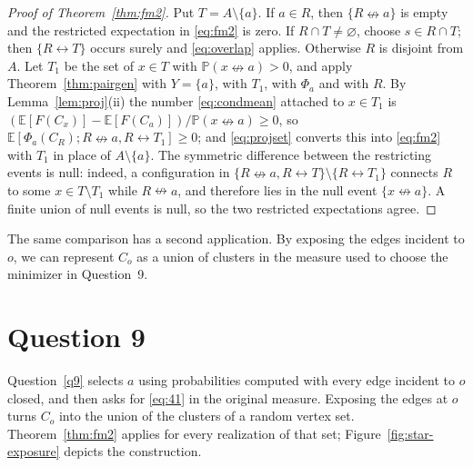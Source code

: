 \documentclass[11pt]{article}
\theoremstyle{definition}
\theoremstyle{remark}
\newcommand{\PP}{\mathbb P}
\newcommand{\EE}{\mathbb E}
\newcommand{\con}{\leftrightarrow}
\newcommand{\ncon}{\nleftrightarrow}
\begin{document}
\begin{proof}[Proof of Theorem~\ref{thm:fm2}]
Put $T=A\setminus\{a\}$. If $a\in R$, then $\{R\ncon
a\}$ is empty and the restricted expectation in \eqref{eq:fm2} is zero. If
$R\cap T\neq\varnothing$, choose $s\in R\cap T$; then $\{R\con T\}$ occurs surely and
\eqref{eq:overlap} applies. Otherwise $R$ is
disjoint from $A$. Let $T_1$ be the set of $x\in T$ with $\PP(x\ncon a)>0$, and apply
Theorem~\ref{thm:pairgen} with $Y=\{a\}$, with $T_1$, with $\Phi_a$ and with $R$. By
Lemma~\ref{lem:proj}(ii) the number \eqref{eq:condmean} attached to $x\in T_1$ is
$(\EE[F(C_x)]-\EE[F(C_a)])/\PP(x\ncon a)\ge0$, so $\EE[\Phi_a(C_R);R\ncon a,R\con
T_1]\ge0$; and \eqref{eq:projset} converts this into \eqref{eq:fm2} with $T_1$ in place of
$A\setminus\{a\}$. The symmetric difference between the restricting events is null:
indeed, a configuration in $\{R\ncon a,R\con T\}\setminus\{R\con T_1\}$ connects $R$ to
some $x\in T\setminus T_1$ while $R\ncon a$, and therefore lies in the null event
$\{x\ncon a\}$. A finite union of null events is null, so the two restricted expectations
agree.
\end{proof}

The same comparison has a second application. By exposing the edges incident to $o$, we
can represent $C_o$ as a union of clusters in the measure used to choose the minimizer in
Question~9.

\section{Question 9}\label{sec:q9}

Question~\ref{q9} selects $a$ using probabilities computed with every edge incident to
$o$ closed, and then asks for \eqref{eq:41} in the original measure. Exposing the edges at
$o$ turns $C_o$ into the union of the clusters of a random vertex set. Theorem~\ref{thm:fm2}
applies for every realization of that set; Figure~\ref{fig:star-exposure} depicts the
construction.
\end{document}

